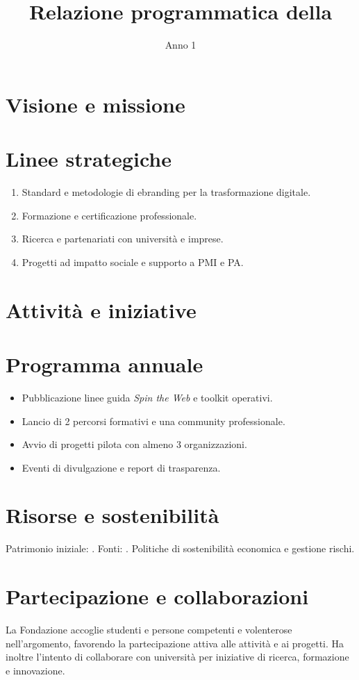 \documentclass[11pt,a4paper]{article}
\title{Relazione programmatica della \FondazioneNome}
\author{}
\date{Anno 1}
\begin{document}
\begin{center}
\end{center}

\maketitle

\section*{Visione e missione}
\FondazioneMissione

\section*{Linee strategiche}
\begin{enumerate}
  \item Standard e metodologie di ebranding per la trasformazione digitale.
  \item Formazione e certificazione professionale.
  \item Ricerca e partenariati con università e imprese.
  \item Progetti ad impatto sociale e supporto a PMI e PA.
\end{enumerate}

\section*{Attività e iniziative}
\FondazioneAttivita

\section*{Programma annuale}
\begin{itemize}
  \item Pubblicazione linee guida \emph{Spin the Web} e toolkit operativi.
  \item Lancio di 2 percorsi formativi e una community professionale.
  \item Avvio di progetti pilota con almeno 3 organizzazioni.
  \item Eventi di divulgazione e report di trasparenza.
\end{itemize}

\section*{Risorse e sostenibilità}
Patrimonio iniziale: \PatrimonioIniziale. Fonti: \FontiFinanziamento. Politiche di sostenibilità economica e gestione rischi.

\section*{Partecipazione e collaborazioni}
La Fondazione accoglie studenti e persone competenti e volenterose nell’argomento, favorendo la partecipazione attiva alle attività e ai progetti. Ha inoltre l’intento di collaborare con università per iniziative di ricerca, formazione e innovazione.
\end{document}
